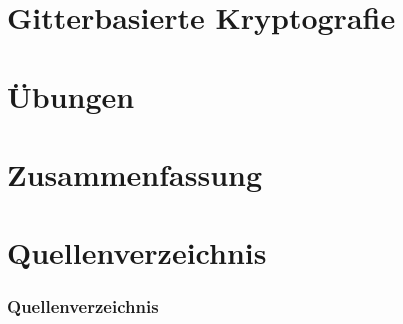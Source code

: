 \documentclass[11pt]{beamer}
\begin{document}
	\begin{frame}
		\maketitle
	\end{frame}
	
	
	
	
	\section{Gitterbasierte Kryptografie}
	
	\section{{\"U}bungen}
	
	\section{Zusammenfassung}
	
	
	\section{Quellenverzeichnis}
	\begin{frame}[allowframebreaks]
		\frametitle{Quellenverzeichnis}
		
		
	\end{frame}
\end{document}
